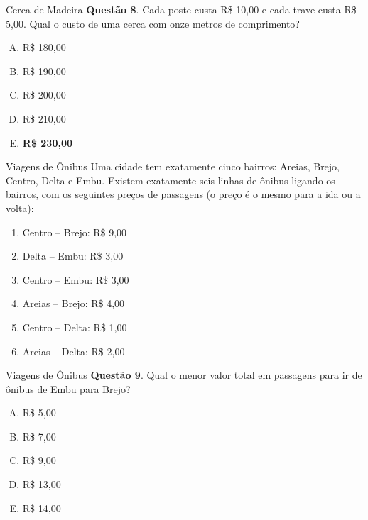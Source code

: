 \documentclass{beamer}
\begin{document}
\begin{frame}{Cerca de Madeira}
\textbf{Questão 8}. Cada poste custa R\$ 10,00 e cada trave custa R\$ 5,00. Qual o custo de uma cerca com onze metros de comprimento?


\begin{enumerate}[(A)]
    \item R\$ 180,00
    \item R\$ 190,00
    \item R\$ 200,00
    \item R\$ 210,00
    \item \textbf{R\$ 230,00}
\end{enumerate}

\end{frame}

\begin{frame}{Viagens de Ônibus}
Uma cidade tem exatamente cinco bairros: Areias, Brejo, Centro, Delta e Embu. Existem exatamente seis linhas de ônibus ligando os bairros, com os seguintes preços de passagens (o preço é o
mesmo para a ida ou a volta):
\begin{center}
\begin{enumerate}[(1)]
\item Centro – Brejo: R\$ 9,00 
\item Delta – Embu: R\$ 3,00
\item Centro – Embu: R\$ 3,00
\item Areias – Brejo: R\$ 4,00
\item Centro – Delta: R\$ 1,00 
\item Areias – Delta: R\$ 2,00
\end{enumerate}
\end{center}

\end{frame}
\begin{frame}{Viagens de Ônibus}
\textbf{Questão 9}. Qual o menor valor total em passagens para ir de ônibus de Embu para Brejo?


\begin{enumerate}[(A)]
    \item R\$ 5,00
    \item R\$ 7,00
    \item R\$ 9,00
    \item R\$ 13,00
    \item R\$ 14,00
\end{enumerate}

\end{frame}
\end{document}
